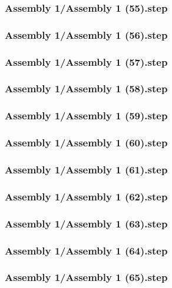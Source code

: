 \documentclass[a4paper,12pt]{article}
\begin{document}
\begin{lstlising}[language=C++]
\subsubsection{Assembly 1/Assembly 1 (55).step}

\subsubsection{Assembly 1/Assembly 1 (56).step}

\subsubsection{Assembly 1/Assembly 1 (57).step}

\subsubsection{Assembly 1/Assembly 1 (58).step}

\subsubsection{Assembly 1/Assembly 1 (59).step}

\subsubsection{Assembly 1/Assembly 1 (60).step}

\subsubsection{Assembly 1/Assembly 1 (61).step}

\subsubsection{Assembly 1/Assembly 1 (62).step}

\subsubsection{Assembly 1/Assembly 1 (63).step}

\subsubsection{Assembly 1/Assembly 1 (64).step}

\subsubsection{Assembly 1/Assembly 1 (65).step}


\end{lstlising}
\end{document}
